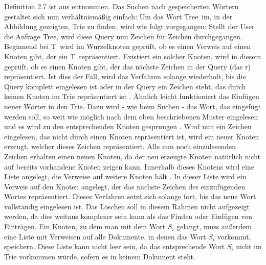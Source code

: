 Definition 2.7 ist aus \cite{Trie_wiki} entnommen.
\newline \newline
Das Suchen nach gespeicherten Wörtern gestaltet sich nun verhältnismäßig einfach: Um das Wort \glqq Tree\grqq\ im, in der Abbildung gezeigten, Trie zu finden, wird wie folgt vorgegangen:
\newline 
Stellt der User die Anfrage \glqq Tree\grqq, wird diese Query nun Zeichen für Zeichen durchgegangen. Beginnend bei \glqq T\grqq\ wird im Wurzelknoten geprüft, ob es einen Verweis auf einen Knoten gibt, der ein \glqq T\grqq\ repräsentiert. Existiert ein solcher Knoten, wird in diesem geprüft, ob es einen Knoten gibt, der das nächste Zeichen in der Query (das \glqq r\grqq) repräsentiert. Ist dies der Fall, wird das Verfahren solange wiederholt, bis die Query komplett eingelesen ist oder in der Query ein Zeichen steht, das durch keinen Knoten im Trie repräsentiert ist \cite{trie_Abb} \cite{Trie_Blog}.
\newline \newline
Ähnlich leicht funktioniert das Einfügen neuer Wörter in den Trie. Dazu wird - wie beim Suchen - das Wort, das eingefügt werden soll, so weit wie möglich nach dem oben beschriebenen Muster eingelesen und es wird zu den entsprechenden Knoten gesprungen \cite{Trie_Blog}. Wird nun ein Zeichen eingelesen, das nicht durch einen Knoten repräsentiert ist, wird ein neuer Knoten erzeugt, welcher dieses Zeichen repräsentiert. Alle nun noch einzulesenden Zeichen erhalten einen neuen Knoten, da der neu erzeugte Knoten natürlich nicht auf bereits vorhandene Knoten zeigen kann. Innerhalb dieses Knotens wird eine Liste angelegt, die Verweise auf weitere Knoten hält \cite{trie_Abb}. In dieser Liste wird ein Verweis auf den Knoten angelegt, der das nächste Zeichen des einzufügenden Wortes repräsentiert. Dieses Verfahren setzt sich solange fort, bis das neue Wort vollständig eingelesen ist.
\newline \newline
Das Löschen soll in diesem Rahmen nicht aufgezeigt werden, da dies weitaus komplexer sein kann als das Finden oder Einfügen von Einträgen.
\newline \newline
Ein Knoten, zu dem man mit dem Wort $S_i$ gelangt, muss außerdem eine Liste mit Verweisen auf alle Dokumente, in denen das Wort $S_i$ vorkommt, speichern. Diese Liste kann nicht leer sein, da das entsprechende Wort $S_i$ nicht im Trie vorkommen würde, sofern es in keinem Dokument steht.

